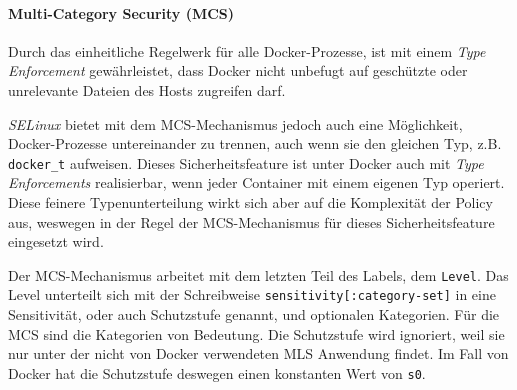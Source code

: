 \documentclass[../main.tex]{subfiles}
\begin{document}

				\paragraph{Multi-Category Security (MCS)}
					Durch das einheitliche Regelwerk für alle Docker-Prozesse, ist mit einem \emph{Type Enforcement} gewährleistet, dass Docker nicht unbefugt auf geschützte oder unrelevante Dateien des Hosts zugreifen darf.

					\emph{SELinux} bietet mit dem MCS-Mechanismus jedoch auch eine Möglichkeit, Docker-Prozesse untereinander zu trennen, auch wenn sie den gleichen Typ, z.B. \texttt{docker\_t} aufweisen. Dieses Sicherheitsfeature ist unter Docker auch mit \emph{Type Enforcements} realisierbar, wenn jeder Container mit einem eigenen Typ operiert. Diese feinere Typenunterteilung wirkt sich aber auf die Komplexität der Policy aus, weswegen in der Regel der MCS-Mechanismus für dieses Sicherheitsfeature eingesetzt wird.

					Der MCS-Mechanismus arbeitet mit dem letzten Teil des Labels, dem \texttt{Level}. Das Level unterteilt sich mit der Schreibweise \texttt{sensitivity[:category-set]} in eine Sensitivität, oder auch Schutzstufe genannt, und optionalen Kategorien. Für die MCS sind die Kategorien von Bedeutung. Die Schutzstufe wird ignoriert, weil sie nur unter der nicht von Docker verwendeten \acrshort{MLS} Anwendung findet. Im Fall von Docker hat die Schutzstufe deswegen einen konstanten Wert von \texttt{s0}.
\end{document}
